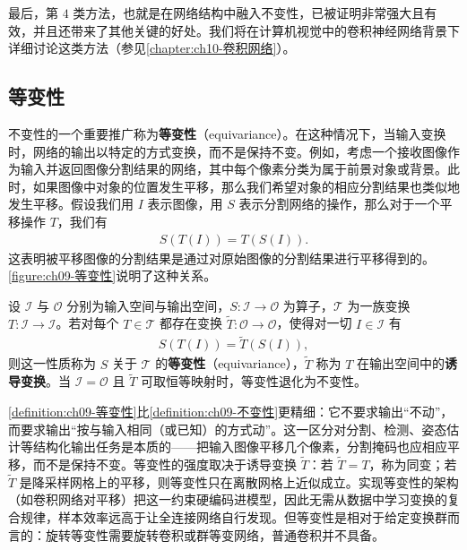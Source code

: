 \documentclass[../../main.tex]{subfiles}
\begin{document}
最后，第 $4$ 类方法，也就是在网络结构中融入不变性，已被证明非常强大且有效，并且还带来了其他关键的好处。我们将在计算机视觉中的卷积神经网络背景下详细讨论这类方法（参见\cref{chapter:ch10-卷积网络}）。

\subsection{等变性}\label{subsection:ch09-等变性}

不变性的一个重要推广称为\textbf{等变性}（equivariance）。在这种情况下，当输入变换时，网络的输出以特定的方式变换，而不是保持不变。例如，考虑一个接收图像作为输入并返回图像分割结果的网络，其中每个像素分类为属于前景对象或背景。此时，如果图像中对象的位置发生平移，那么我们希望对象的相应分割结果也类似地发生平移。假设我们用 $I$ 表示图像，用 $S$ 表示分割网络的操作，那么对于一个平移操作 $T$，我们有
\begin{align}
S(T(I))=T(S(I)).
\label{align:ch09-等变性}
\end{align}
这表明被平移图像的分割结果是通过对原始图像的分割结果进行平移得到的。\cref{figure:ch09-等变性}说明了这种关系。

\begin{definition}[等变性]\label{definition:ch09-等变性}
设 $\mathcal{I}$ 与 $\mathcal{O}$ 分别为输入空间与输出空间，$S:\mathcal{I}\to\mathcal{O}$ 为算子，$\mathcal{T}$ 为一族变换 $T:\mathcal{I}\to\mathcal{I}$。若对每个 $T\in\mathcal{T}$ 都存在变换 $\tilde{T}:\mathcal{O}\to\mathcal{O}$，使得对一切 $I\in\mathcal{I}$ 有
\begin{align*}
S(T(I))=\tilde{T}(S(I)),
\end{align*}
则这一性质称为 $S$ 关于 $\mathcal{T}$ 的\textbf{等变性}（equivariance），$\tilde{T}$ 称为 $T$ 在输出空间中的\textbf{诱导变换}。当 $\mathcal{I}=\mathcal{O}$ 且 $\tilde{T}$ 可取恒等映射时，等变性退化为不变性。
\end{definition}

\begin{remark}\cref{definition:ch09-等变性}比\cref{definition:ch09-不变性}更精细：它不要求输出“不动”，而要求输出“按与输入相同（或已知）的方式动”。这一区分对分割、检测、姿态估计等结构化输出任务是本质的——把输入图像平移几个像素，分割掩码也应相应平移，而不是保持不变。等变性的强度取决于诱导变换 $\tilde{T}$：若 $\tilde{T}=T$，称为同变；若 $\tilde{T}$ 是降采样网格上的平移，则等变性只在离散网格上近似成立。实现等变性的架构（如卷积网络对平移）把这一约束硬编码进模型，因此无需从数据中学习变换的复合规律，样本效率远高于让全连接网络自行发现。但等变性是相对于给定变换群而言的：旋转等变性需要旋转卷积或群等变网络，普通卷积并不具备。
\end{remark}
\end{document}
